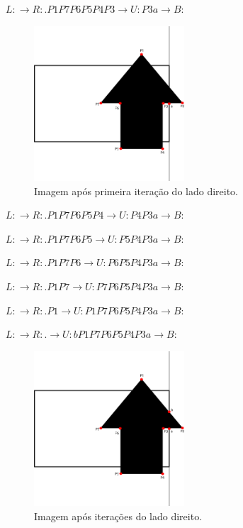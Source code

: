 \documentclass[12pt]{article}
\begin{document}
$L: \xrightarrow{} R: .P1P7P6P5P4P3 \xrightarrow{} U: P3a \xrightarrow{} B:$

\begin{figure}[H]
    \centering
    \includegraphics[width=0.5\textwidth]{images/5/5it2.png}
    \caption*{Imagem após primeira iteração do lado direito.}
\end{figure}{}

$L: \xrightarrow{} R: .P1P7P6P5P4 \xrightarrow{} U: P4P3a \xrightarrow{} B:$

$L: \xrightarrow{} R: .P1P7P6P5 \xrightarrow{} U: P5P4P3a \xrightarrow{} B:$

$L: \xrightarrow{} R: .P1P7P6 \xrightarrow{} U: P6P5P4P3a \xrightarrow{} B:$

$L: \xrightarrow{} R: .P1P7 \xrightarrow{} U: P7P6P5P4P3a \xrightarrow{} B:$

$L: \xrightarrow{} R: .P1 \xrightarrow{} U: P1P7P6P5P4P3a \xrightarrow{} B:$

$L: \xrightarrow{} R: . \xrightarrow{} U: bP1P7P6P5P4P3a \xrightarrow{} B:$

\begin{figure}[H]
    \centering
    \includegraphics[width=0.5\textwidth]{images/5/5it3.png}
    \caption*{Imagem após iterações do lado direito.}
\end{figure}{}
\end{document}
